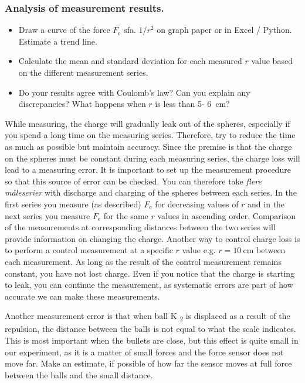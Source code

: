 \documentclass[../Elmag-labhefte-2022.tex]{subfiles}
\begin{document}
\begin{itemize}
\subsubsection{Analysis of measurement results.}
\vspace{-4mm}
\begin{itemize}
    \item Draw a curve of the force $F_\text{e}$ sfa. $1/r^2$ on graph paper or in Excel / Python. Estimate a trend line.
    \item Calculate the mean and standard deviation for each measured $r$ value based on the different measurement series.
    \item Do your results agree with Coulomb's law? Can you explain any discrepancies? What happens when $r$ is less than 5- \SI{6}{\cm}?
\end{itemize}


While measuring, the charge will gradually leak out of the spheres, especially if you spend a long time on the measuring series. Therefore, try to reduce the time as much as possible but maintain accuracy. Since the premise is that the charge on the spheres must be constant during each measuring series, the charge loss will lead to a measuring error. It is important to set up the measurement procedure so that this source of error can be checked. You can therefore take \emph{flere måleserier} with discharge and charging of the spheres between each series. In the first series you measure (as described) $F_\text{e}$ for decreasing values   of $r$ and in the next series you measure $F_\text{e}$ for the same $r$ values   in ascending order. Comparison of the measurements at corresponding distances between the two series will provide information on changing the charge. Another way to control charge loss is to perform a control measurement at a specific $r$ value e.g. $r = \SI{10}{\cm}$ between each measurement. As long as the result of the control measurement remains constant, you have not lost charge. Even if you notice that the charge is starting to leak, you can continue the measurement, as systematic errors are part of how accurate we can make these measurements.

Another measurement error is that when ball K \textsubscript{2} is displaced as a result of the repulsion, the distance between the balls is not equal to what the scale indicates. This is most important when the bullets are close, but this effect is quite small in our experiment, as it is a matter of small forces and the force sensor does not move far. Make an estimate, if possible of how far the sensor moves at full force between the balls and the small distance.


\end{itemize}
\end{document}

